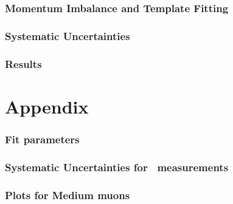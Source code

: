 \documentclass[NOTE,UKenglish,coverpage,txfonts,texlive=2019]{\ATLASLATEXPATH atlasdoc}
\begin{document}
\section{Momentum Imbalance and Template Fitting}
\label{sec:dpop_cuts}

\clearpage


%
\FloatBarrier
\section{Systematic Uncertainties}
\label{sec:systematics}

\clearpage
\FloatBarrier
\section{Results}%
\label{sec:results}

\clearpage




\FloatBarrier
\appendix
\part*{Appendix}
\section{Fit parameters}
\label{sec:fit_parameters}

\clearpage
\section{Systematic Uncertainties for \pp\ measurements}
\label{sec:systematicsPP}

\clearpage
\section{Plots for Medium muons}
\label{sec:MediumMuonPlots}

\clearpage
\end{document}
